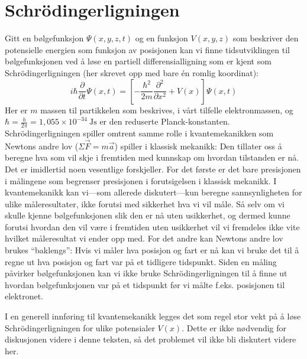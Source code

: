 \section{Schr{\"o}dingerligningen}
\label{sec:kvante:schrodinger}
Gitt en bølgefunksjon $\Psi(x,y,z,t)$ og en funksjon $V(x,y,z)$ som beskriver den potensielle energien som funksjon av posisjonen kan vi finne tidsutviklingen til bølgefunksjonen ved å løse en partiell differensialligning som er kjent som Schr{\"o}dingerligningen (her skrevet opp med bare \'en romlig koordinat):
\begin{displaymath}
	i\hbar\frac{\partial}{\partial t}\Psi(x,t) = \left[ - \frac{\hbar^2}{2m}\frac{\partial^2}{\partial x^2} + V(x)\right]\Psi(x,t)
\end{displaymath}
Her er $m$ massen til partikkelen som beskrives, i vårt tilfelle elektronmassen, og $\hbar = \frac{h}{2\pi} = 1,055\times10^{-34}~\mathrm{Js}$ er den reduserte Planck-konstanten. Schr{\"o}dingerligningen spiller omtrent samme rolle i kvantemekanikken som Newtons andre lov ($\Sigma \vec{F} = m\vec{a}$) spiller i klassisk mekanikk: Den tillater oss å beregne hva som vil skje i fremtiden med kunnskap om hvordan tilstanden er nå. Det er imidlertid noen vesentlige forskjeller. For det første er det bare presisjonen i målingene som begrenser presisjonen i forutsigelsen i klassisk mekanikk. I kvantemekanikk kan vi---som allerede diskutert---kun beregne sannsynligheten for ulike måleresultater, ikke forutsi med sikkerhet hva vi vil måle. Så selv om vi skulle kjenne bølgefunksjonen slik den er nå uten usikkerhet, og dermed kunne forutsi hvordan den vil være i fremtiden uten usikkerhet vil vi fremdeles ikke vite hvilket måleresultat vi ender opp med. For det andre kan Newtons andre lov brukes ``baklengs'': Hvis vi måler hva posisjon og fart er nå kan vi bruke det til å regne ut hva posisjon og fart var på et tidligere tidspunkt. Siden en måling påvirker bølgefunksjonen kan vi ikke bruke Schr{\"o}dingerligningen til å finne ut hvordan bølgefunksjonen var på et tidspunkt før vi målte f.eks. posisjonen til elektronet.

I en generell innføring til kvantemekanikk legges det som regel stor vekt på å løse Schr{\"o}dingerligningen for ulike potensialer $V(x)$. Dette er ikke nødvendig for diskusjonen videre i denne teksten, så det problemet vil ikke bli diskutert videre her.

